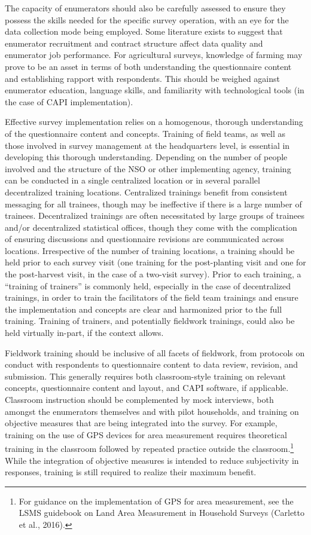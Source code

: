 \documentclass[
]{book}
\begin{document}
The capacity of enumerators should also be carefully assessed to ensure they possess the skills needed for the specific survey operation, with an eye for the data collection mode being employed. Some literature exists to suggest that enumerator recruitment and contract structure affect data quality and enumerator job performance. For agricultural surveys, knowledge of farming may prove to be an asset in terms of both understanding the questionnaire content and establishing rapport with respondents. This should be weighed against enumerator education, language skills, and familiarity with technological tools (in the case of CAPI implementation).

Effective survey implementation relies on a homogenous, thorough understanding of the questionnaire content and concepts. Training of field teams, as well as those involved in survey management at the headquarters level, is essential in developing this thorough understanding. Depending on the number of people involved and the structure of the NSO or other implementing agency, training can be conducted in a single centralized location or in several parallel decentralized training locations. Centralized trainings benefit from consistent messaging for all trainees, though may be ineffective if there is a large number of trainees. Decentralized trainings are often necessitated by large groups of trainees and/or decentralized statistical offices, though they come with the complication of ensuring discussions and questionnaire revisions are communicated across locations. Irrespective of the number of training locations, a training should be held prior to each survey visit (one training for the post-planting visit and one for the post-harvest visit, in the case of a two-visit survey). Prior to each training, a ``training of trainers'' is commonly held, especially in the case of decentralized trainings, in order to train the facilitators of the field team trainings and ensure the implementation and concepts are clear and harmonized prior to the full training. Training of trainers, and potentially fieldwork trainings, could also be held virtually in-part, if the context allows.

Fieldwork training should be inclusive of all facets of fieldwork, from protocols on conduct with respondents to questionnaire content to data review, revision, and submission. This generally requires both classroom-style training on relevant concepts, questionnaire content and layout, and CAPI software, if applicable. Classroom instruction should be complemented by mock interviews, both amongst the enumerators themselves and with pilot households, and training on objective measures that are being integrated into the survey. For example, training on the use of GPS devices for area measurement requires theoretical training in the classroom followed by repeated practice outside the classroom.\footnote{For guidance on the implementation of GPS for area measurement, see the LSMS guidebook on Land Area Measurement in Household Surveys (Carletto et al., 2016).} While the integration of objective measures is intended to reduce subjectivity in responses, training is still required to realize their maximum benefit.
\end{document}
